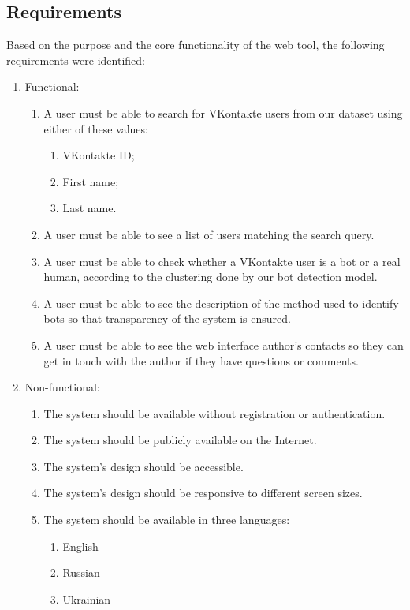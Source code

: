 \subsection{Requirements}
\label{sec:requirements}
Based on the purpose and the core functionality of the web tool, the following requirements were identified:
\begin{enumerate}
    \item Functional:
    \begin{enumerate}
        \item A user must be able to search for VKontakte users from our dataset using either of these values:
        \begin{enumerate}
            \item VKontakte ID;
            \item First name;
            \item Last name.
        \end{enumerate}
        \item A user must be able to see a list of users matching the search query.
        \item A user must be able to check whether a VKontakte user is a bot or a real human, according to the clustering done by our bot detection model.
        \item A user must be able to see the description of the method used to identify bots so that transparency of the system is ensured.
        \item A user must be able to see the web interface author’s contacts so they can get in touch with the author if they have questions or comments.
    \end{enumerate}
    \item Non-functional:
    \begin{enumerate}
        \item The system should be available without registration or authentication.
        \item The system should be publicly available on the Internet.
        \item The system’s design should be accessible.
        \item The system’s design should be responsive to different screen sizes.
        \item The system should be available in three languages:
        \begin{enumerate}
            \item English
            \item Russian
            \item Ukrainian
        \end{enumerate}
    \end{enumerate}
\end{enumerate}

